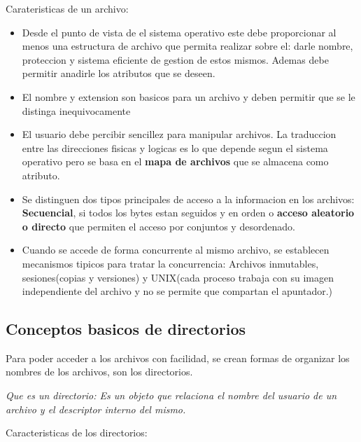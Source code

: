 \documentclass[12pt, letterpaper]{article}
\begin{document}
Carateristicas de un archivo:

\begin{itemize}
	\item Desde el punto de vista de el sistema operativo este debe proporcionar al menos una estructura de archivo que permita realizar sobre el: darle nombre, proteccion y sistema eficiente de gestion de estos mismos. Ademas debe permitir anadirle los atributos que se deseen.
	\item El nombre y extension son basicos para un archivo y deben permitir que se le distinga inequivocamente
	\item El usuario debe percibir sencillez para manipular archivos. La traduccion entre las direcciones fisicas y logicas es lo que depende segun el sistema operativo pero se basa en el \textbf{mapa de archivos} que se almacena como atributo.
	\item Se distinguen dos tipos principales de acceso a la informacion en los archivos: \textbf{Secuencial}, si todos los bytes estan seguidos y en orden o \textbf{acceso aleatorio o directo} que permiten el acceso por conjuntos y desordenado.
	\item Cuando se accede de forma concurrente al mismo archivo, se establecen mecanismos tipicos para tratar la concurrencia: Archivos inmutables, sesiones(copias y versiones) y UNIX(cada proceso trabaja con su imagen independiente del archivo y no se permite que compartan el apuntador.)
\end{itemize}

\subsection{Conceptos basicos de directorios}
Para poder acceder a los archivos con facilidad, se crean formas de organizar los nombres de los archivos, son los directorios.

\textit{Que es un directorio: Es un objeto que relaciona el nombre del usuario de un archivo y el descriptor interno del mismo.}

Caracteristicas de los directorios:
\end{document}
